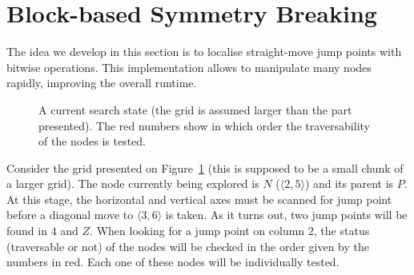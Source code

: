 \section{Block-based Symmetry Breaking}
\label{sec::blocks2}

The idea we develop in this section 
is to localise straight-move jump points with bitwise operations.  
This implementation allows to manipulate 
many nodes rapidly, 
improving the overall runtime.  

\begin{figure}[ht]
  \begin{center}
  \end{center}
  \caption{A current search state 
    (the grid is assumed larger than the part presented).
  The red numbers show in which order the traversability of the nodes 
  is tested.}
  \label{fig::gridforblocks}
\end{figure}

Consider the grid presented on Figure~\ref{fig::gridforblocks} 
(this is supposed to be a small chunk of a larger grid).  
The node currently being explored is $N$ ($\langle 2,5\rangle$)
and its parent is $P$.  
At this stage, the horizontal and vertical axes must be scanned 
for jump point before a diagonal move to $\langle 3,6\rangle$ is taken.  
As it turns out, two jump points will be found in $4$ and $Z$.  
When looking for a jump point on column $2$, 
the status (traversable or not) of the nodes 
will be checked in the order given by the numbers in red.  
Each one of these nodes will be individually tested.  


